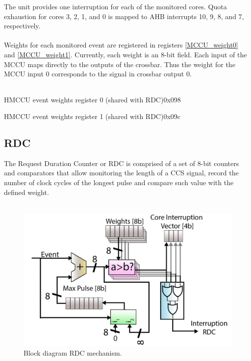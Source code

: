 The unit provides one interruption for each of the monitored cores. Quota exhaustion for cores 3, 2, 1, and 0 is mapped to AHB interrupts 10, 9, 8, and 7, respectively.\\
\\
Weights for each monitored event are registered in registers \ref{MCCU_weight0} and \ref{MCCU_weight1}. Currently, each weight is an 8-bit field. Each input of the MCCU maps directly to the outputs of the crossbar. Thus the weight for the MCCU input 0 corresponds to the signal in crossbar output 0.\\
\\
\begin{register}{H}{MCCU event weights register 0 (shared with RDC)}{0x098}
	\label{MCCU_weight0}
	\regnewline
\end{register}
\begin{register}{H}{MCCU event weights register 1 (shared with RDC)}{0x09c}
	\label{MCCU_weight1}
	\regnewline
\end{register}

\subsection{RDC}
The Request Duration Counter or RDC is comprised of a set of 8-bit counters and comparators that allow monitoring the length of a CCS signal, record the number of clock cycles of the longest pulse and compare such value with the defined weight.\\
\\
\begin{figure}[H]
	\begin{center}
	\includegraphics[keepaspectratio,scale=0.15]{img/bd_RDC.png}
	\caption{Block diagram RDC mechanism.}
	\label{fig:blk_RDC}
	\end{center}
\end{figure}

